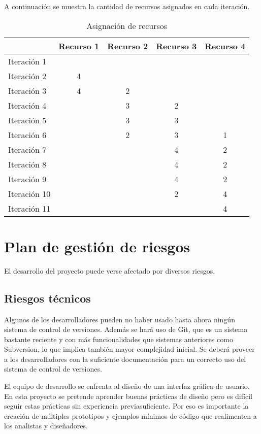 A continuación se muestra la cantidad de recursos
asignados en cada iteración.

{\footnotesize
\begin{longtable}[c]{l|c|c|c|c|}
\caption{Asignación de recursos} \\

 & \textbf{Recurso 1} & \textbf{Recurso 2} & \textbf{Recurso 3}
& \textbf{Recurso 4} \\
\hline \hline
\endhead

Iteración  1 &   &   &   &   \\
Iteración  2 & 4 &   &   &   \\
Iteración  3 & 4 & 2 &   &   \\
Iteración  4 &   & 3 & 2 &   \\
Iteración  5 &   & 3 & 3 &   \\
Iteración  6 &   & 2 & 3 & 1 \\
Iteración  7 &   &   & 4 & 2 \\
Iteración  8 &   &   & 4 & 2 \\
Iteración  9 &   &   & 4 & 2 \\
Iteración 10 &   &   & 2 & 4 \\
Iteración 11 &   &   &   & 4 \\
\hline
\end{longtable}
}

\section{Plan de gestión de riesgos}

El desarrollo del proyecto puede verse afectado por diversos riesgos.

\subsection{Riesgos técnicos}

Algunos de los desarrolladores pueden no haber usado hasta ahora ningún sistema
de control de versiones. Además se hará uso de Git, que es un sistema
bastante reciente y con más funcionalidades que sistemas anteriores como
Subversion, lo que implica también mayor complejidad inicial. Se deberá proveer
a los desarrolladores con la suficiente documentación para un correcto uso del
sistema de control de versiones.

El equipo de desarrollo se enfrenta al diseño de una interfaz gráfica de
usuario. En esta proyecto se pretende aprender buenas prácticas de diseño pero
es difícil seguir estas prácticas sin experiencia previasuficiente. Por eso es
importante la creación de múltiples prototipos y ejemplos mínimos de código que
realimenten a los analistas y diseñadores.


